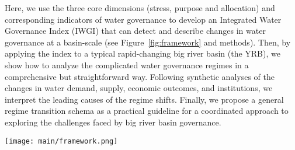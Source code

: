 Here, we use the three core dimensions (stress, purpose and allocation) and corresponding indicators of water governance to develop an Integrated Water Governance Index (IWGI) that can detect and describe changes in water governance at a basin-scale (see Figure~\ref{fig:framework} and methods).
Then, by applying the index to a typical rapid-changing big river basin (the YRB), we show how to analyze the complicated water governance regimes in a comprehensive but straightforward way.
Following synthetic analyses of the changes in water demand, supply, economic outcomes, and institutions, we interpret the leading causes of the regime shifts.
Finally, we propose a general regime transition schema as a practical guideline for a coordinated approach to exploring the challenges faced by big river basin governance.

\begin{figure*}%
	\centering
	\texttt{[image: main/framework.png]}
	\caption{
		Identifying the water governance regimes in transitions of a hydrosocial cycle.
		\textbf{A.} Water governance has three key dimensions (stress, purpose and allocation), each of which has two potential directions (denoted in red) when changing. (1) ``stress'' of water shifts between scarcity and abundance; (2) weighting ``purpose'' of water between consumptive services or non-consumptive uses; (3) ``allocation'' changes between balanced or lopsided.
		\textbf{B.} Along with a transition in hydrosocial water cycle, water governance shifts in line with the three dimensions. Combining corresponding indicators, an abrupt change of the IWGI thus indicates a regime shift in water governance.
	}
	\label{fig:framework}
\end{figure*}
